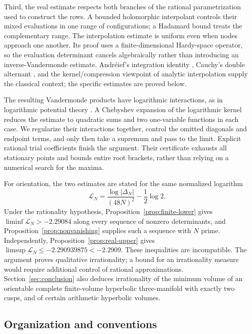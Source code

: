 Third, the real estimate respects both branches of the rational
parametrization used to construct the rows. A bounded holomorphic
interpolant controls their mixed evaluations in one range of
configurations; a Hadamard bound treats the complementary range.
The interpolation estimate is uniform even when nodes approach one
another. Its proof uses a finite-dimensional Hardy-space operator,
so the evaluation determinant cancels algebraically rather than
introducing an inverse-Vandermonde estimate.
Andr\'eief's integration identity \cite{Forrester2018Andreief},
Cauchy's double alternant \cite{Krattenthaler1999}, and the
kernel/compression viewpoint of analytic interpolation
\cite{Sarason1967} supply the classical context; the
specific estimates are proved below.

The resulting Vandermonde products have logarithmic interactions,
as in logarithmic potential theory \cite{Saff2010}.
A Chebyshev expansion of the logarithmic kernel
\cite[Lemma~3.1]{GaroufalidisPopescu2013} reduces the estimate to
quadratic sums and two one-variable functions in each case. We regularize
their interactions together, control the omitted diagonals and endpoint
terms, and only then take a supremum and pass to the limit.
Explicit rational trial coefficients finish the argument. Their
certificate exhausts all stationary points and bounds entire root
brackets, rather than relying on a numerical search for the maxima.

For orientation, the two estimates are stated for the same normalized
logarithm
\begin{equation}\label{eq:normalized-logarithm}
\mathcal L_N=\frac{\log|\Delta_N|}{(48N)^2}-\frac12\log 2.
\end{equation}
Under the rationality hypothesis, Proposition~\ref{prop:finite-lower}
gives $\liminf\mathcal L_N>-2.29084$ along every sequence of nonzero
determinants, and Proposition~\ref{prop:nonvanishing} supplies such a
sequence with $N$ prime. Independently,
Proposition~\ref{prop:real-upper} gives
$\limsup\mathcal L_N\le-2.290939875<-2.2909$.
These inequalities are incompatible. The argument proves qualitative
irrationality; a bound for an irrationality measure would require
additional control of rational approximations.
Section~\ref{sec:conclusion} also deduces irrationality of the minimum
volume of an orientable complete finite-volume hyperbolic three-manifold
with exactly two cusps, and of certain arithmetic hyperbolic volumes.

\subsection{Organization and conventions}

